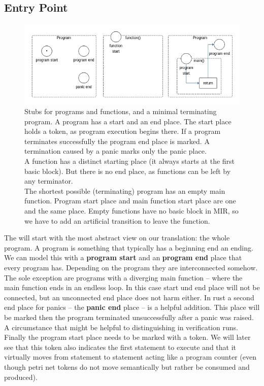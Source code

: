 \subsection{Entry Point}
\begin{figure}
    \centering
    \includegraphics[width=.9\textwidth]{../diagrams/basic_program.png}
    \caption{
        Stubs for programs and functions, and a minimal terminating program.
        A program has a start and an end place.
        The start place holds a token, as program execution begins there.
        If a program terminates successfully the program end place is marked.
        A termination caused by a panic marks only the panic place.\\
        A function has a distinct starting place (it always starts at the first basic block).
        But there is no end place, as functions can be left by any terminator.\\
        The shortest possible (terminating) program has an empty main function.
        Program start place and main function start place are one and the same place.
        Empty functions have no basic block in MIR, so we have to add an artificial transition to leave the function.
    }
    \label{program_blocks_trans}
\end{figure}
The will start with the most abstract view on our translation: the whole program.
A program is something that typically has a beginning end an ending.
We can model this with a \textbf{program start} and an \textbf{program end} place that every program has.
Depending on the program they are interconnected somehow.
The sole exception are programs with a diverging main function -- where the main function ends in an endless loop.
In this case start und end place will not be connected, but an unconnected end place does not harm either.
In rust a second end place for panics -- the \textbf{panic end} place -- is a helpful addition.
This place will be marked then the program terminated unsuccessfully after a panic was raised.
A circumstance that might be helpful to distinguishing in verification runs.
Finally the program start place needs to be marked with a token.
We will later see that this token also indicates the first statement to execute and that it virtually moves from statement to statement acting like a program counter (even though petri net tokens do not move semantically but rather be consumed and produced).


